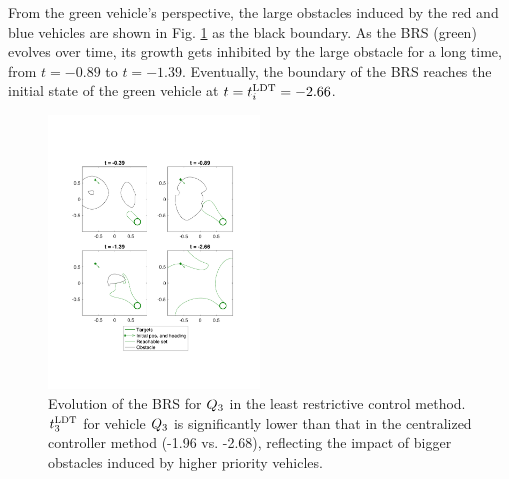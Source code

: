 From the green vehicle's perspective, the large obstacles induced by the red and blue vehicles are shown in Fig. \ref{fig:lrc_rs3} as the black boundary. As the BRS (green) evolves over time, its growth gets inhibited by the large obstacle for a long time, from $t=-0.89$ to $t=-1.39$. Eventually, the boundary of the BRS reaches the initial state of the green vehicle at $t = t^\text{LDT}_i = -2.66$.

\begin{figure}[h]
  \centering
  \includegraphics[width=0.5\textwidth]{"fig/lrc_rs3"}
  \caption{Evolution of the BRS for $Q_3$ in the least restrictive control method. $t^\text{LDT}_3$ for vehicle $Q_3$ is significantly lower than that in the centralized controller method (-1.96 vs. -2.68), reflecting the impact of bigger obstacles induced by higher priority vehicles.}
  \label{fig:lrc_rs3}
\end{figure}